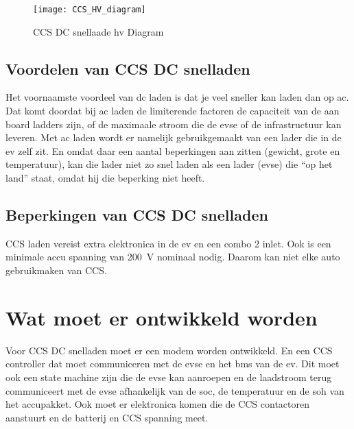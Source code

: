 \begin{figure}[h]
    \centering
    \texttt{[image: CCS\_HV\_diagram]}
    \caption{CCS DC snellaade \ac{hv} Diagram}
    \label{fig:CCS_HV_diagram}
\end{figure}

\subsection{Voordelen van CCS DC snelladen}

Het voornaamste voordeel van \ac{dc} laden is dat je veel sneller kan laden dan
op \ac{ac}. Dat komt doordat bij \ac{ac} laden de limiterende factoren de
capaciteit van de aan board ladders zijn, of de maximaale stroom die de
\ac{evse} of de infrastructuur  kan leveren. Met \ac{ac} laden wordt er
namelijk gebruikgemaakt van een lader die in de \ac{ev} zelf zit. En omdat daar
een aantal beperkingen aan zitten (gewicht, grote en temperatuur), kan die
lader niet zo snel laden als een lader (\ac{evse}) die ``op het land'' staat,
omdat hij die beperking niet heeft. 

\subsection{Beperkingen van CCS DC snelladen}

CCS laden vereist extra elektronica in de \ac{ev} en een combo 2 inlet. Ook is
een minimale accu spanning van \si{200\volt} nominaal nodig. Daarom kan niet
elke auto gebruikmaken van CCS.

\section{Wat moet er ontwikkeld worden}

Voor CCS DC snelladen moet er een modem worden ontwikkeld. En een CCS
controller dat moet communiceren met de \ac{evse} en het \ac{bms} van de
\ac{ev}. Dit moet ook een state machine zijn die de \ac{evse} kan aanroepen en
de laadstroom terug communiceert met de \ac{evse} afhankelijk van de \ac{soc},
de temperatuur en de \ac{soh} van het accupakket. Ook moet er elektronica komen
die de CCS contactoren aanstuurt en de batterij en CCS spanning meet.
